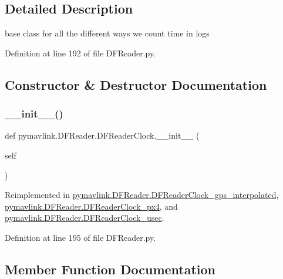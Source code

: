 \subsection{Detailed Description}
\begin{DoxyVerb}base class for all the different ways we count time in logs\end{DoxyVerb}
 

Definition at line 192 of file D\+F\+Reader.\+py.



\subsection{Constructor \& Destructor Documentation}
\mbox{\label{classpymavlink_1_1DFReader_1_1DFReaderClock_a99d4363951b5ef9866cbd021ca4dd80f}} 
\subsubsection{\texorpdfstring{\_\_init\_\_()}{\_\_init\_\_()}}
{\footnotesize\ttfamily def pymavlink.\+D\+F\+Reader.\+D\+F\+Reader\+Clock.\+\_\+\+\_\+init\+\_\+\+\_\+ (\begin{DoxyParamCaption}\item[{}]{self }\end{DoxyParamCaption})}



Reimplemented in \mbox{\hyperlink{classpymavlink_1_1DFReader_1_1DFReaderClock__gps__interpolated_a3f055fcf15691808e52dec36a04d2efd}{pymavlink.\+D\+F\+Reader.\+D\+F\+Reader\+Clock\+\_\+gps\+\_\+interpolated}}, \mbox{\hyperlink{classpymavlink_1_1DFReader_1_1DFReaderClock__px4_a6fb11e110087f31f5c7cce4b8ee95a36}{pymavlink.\+D\+F\+Reader.\+D\+F\+Reader\+Clock\+\_\+px4}}, and \mbox{\hyperlink{classpymavlink_1_1DFReader_1_1DFReaderClock__usec_a392d07c4a8ea07255cd30ecb41322e7c}{pymavlink.\+D\+F\+Reader.\+D\+F\+Reader\+Clock\+\_\+usec}}.



Definition at line 195 of file D\+F\+Reader.\+py.



\subsection{Member Function Documentation}
\mbox{\label{classpymavlink_1_1DFReader_1_1DFReaderClock_a49037f269d69afa423bc7c4a5e1983ba}} 

